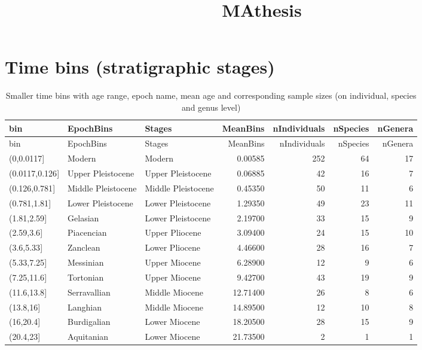 \documentclass[]{article}
\title{MAthesis}
\author{}
\date{}
\begin{document}
\maketitle

{
\setcounter{tocdepth}{2}
\tableofcontents
}
\section{Time bins (stratigraphic
stages)}\label{time-bins-stratigraphic-stages}

\begin{longtable}[]{@{}lllrrrr@{}}
\caption{Smaller time bins with age range, epoch name, mean age and
corresponding sample sizes (on individual, species and genus
level)}\tabularnewline
\toprule
bin & EpochBins & Stages & MeanBins & nIndividuals & nSpecies &
nGenera\tabularnewline
\midrule
\endfirsthead
\toprule
bin & EpochBins & Stages & MeanBins & nIndividuals & nSpecies &
nGenera\tabularnewline
\midrule
\endhead
(0,0.0117{]} & Modern & Modern & 0.00585 & 252 & 64 & 17\tabularnewline
(0.0117,0.126{]} & Upper Pleistocene & Upper Pleistocene & 0.06885 & 42
& 16 & 7\tabularnewline
(0.126,0.781{]} & Middle Pleistocene & Middle Pleistocene & 0.45350 & 50
& 11 & 6\tabularnewline
(0.781,1.81{]} & Lower Pleistocene & Lower Pleistocene & 1.29350 & 49 &
23 & 11\tabularnewline
(1.81,2.59{]} & Gelasian & Lower Pleistocene & 2.19700 & 33 & 15 &
9\tabularnewline
(2.59,3.6{]} & Piacencian & Upper Pliocene & 3.09400 & 24 & 15 &
10\tabularnewline
(3.6,5.33{]} & Zanclean & Lower Pliocene & 4.46600 & 28 & 16 &
7\tabularnewline
(5.33,7.25{]} & Messinian & Upper Miocene & 6.28900 & 12 & 9 &
6\tabularnewline
(7.25,11.6{]} & Tortonian & Upper Miocene & 9.42700 & 43 & 19 &
9\tabularnewline
(11.6,13.8{]} & Serravallian & Middle Miocene & 12.71400 & 26 & 8 &
6\tabularnewline
(13.8,16{]} & Langhian & Middle Miocene & 14.89500 & 12 & 10 &
8\tabularnewline
(16,20.4{]} & Burdigalian & Lower Miocene & 18.20500 & 28 & 15 &
9\tabularnewline
(20.4,23{]} & Aquitanian & Lower Miocene & 21.73500 & 2 & 1 &
1\tabularnewline
\bottomrule
\end{longtable}
\end{document}
